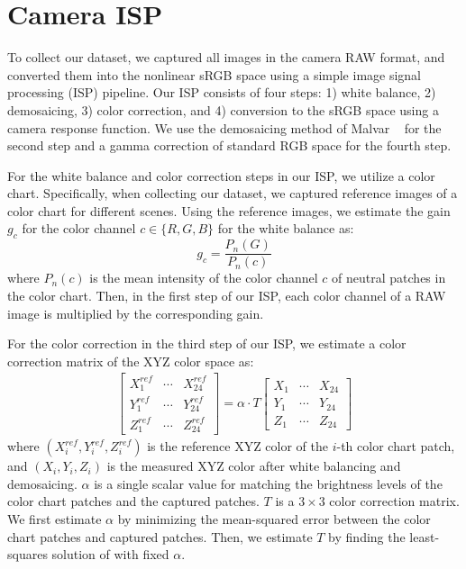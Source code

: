 \section{Camera ISP}
\label{sec:details_ISP}


To collect our dataset, we captured all images in the camera RAW format, and converted them into the nonlinear sRGB space using a simple image signal processing (ISP) pipeline.
Our ISP consists of four steps: 1) white balance, 2) demosaicing, 3) color correction, and 4) conversion to the sRGB space using a camera response function.
We use the demosaicing method of Malvar \etal~\cite{Malvar_2004_ICASSP} for the second step and a gamma correction of standard RGB space for the fourth step.


For the white balance and color correction steps in our ISP, we utilize a color chart.
Specifically, when collecting our dataset, we captured reference images of a color chart for different scenes.
Using the reference images, we estimate the gain $g_c$ for the color channel $c \in \{R,G,B\}$ for the white balance as:
\begin{equation}
    g_c = \frac{P_{n}(G)}{P_{n}(c)} \label{eq:gain}
\end{equation}
where $P_{n}(c)$ is the mean intensity of the color channel $c$ of neutral patches in the color chart.
Then, in the first step of our ISP, each color channel of a RAW image is multiplied by the corresponding gain.



For the color correction in the third step of our ISP,
we estimate a color correction matrix of the XYZ color space as:
\begin{eqnarray}
\begin{bmatrix}
X_1^{ref} & \cdots  & X_{24}^{ref} \\ 
Y_1^{ref} & \cdots  & Y_{24}^{ref} \\ 
Z_1^{ref} & \cdots  & Z_{24}^{ref}
\end{bmatrix} = \alpha \cdot T \begin{bmatrix}
X_1 & \cdots  & X_{24} \\ 
Y_1 & \cdots  & Y_{24} \\ 
Z_1 & \cdots  & Z_{24}
\end{bmatrix}
\label{eq:color_correction_matrix}
\end{eqnarray}
where $(X_i^{ref}, Y_i^{ref}, Z_i^{ref})$ is the reference XYZ color of the $i$-th color chart patch,
and $(X_i, Y_i, Z_i)$ is the measured XYZ color after white balancing and demosaicing.
$\alpha$ is a single scalar value for matching the brightness levels of the color chart patches and the captured patches.
$T$ is a $3\times3$ color correction matrix.
We first estimate $\alpha$ by minimizing the mean-squared error between the color chart patches and captured patches.
Then, we estimate $T$ by finding the least-squares solution of  with fixed $\alpha$.

